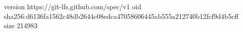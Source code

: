 version https://git-lfs.github.com/spec/v1
oid sha256:d6136fa1562c48db2644c08edca47058606445ab555a212740b12fcf9d4b5cff
size 214983
